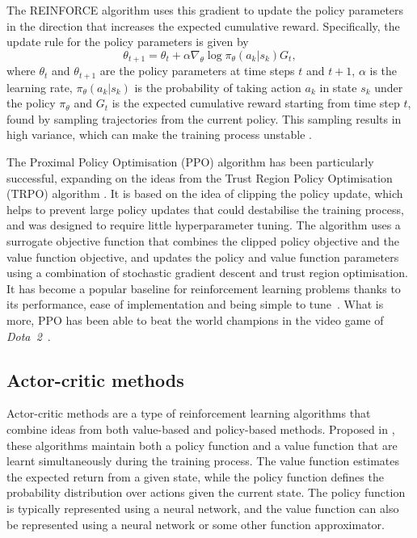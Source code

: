 The REINFORCE algorithm uses this gradient to update the policy parameters in the direction that increases the expected cumulative reward. Specifically, the update rule for the policy parameters is given by
\begin{equation}
    \theta_{t+1} = \theta_t + \alpha \nabla_{\theta} \log \pi_{\theta}(a_k|s_k) G_t,
\end{equation}
where $\theta_t$ and $\theta_{t+1}$ are the policy parameters at time steps $t$ and $t+1$, $\alpha$ is the learning rate, $\pi_{\theta}(a_k|s_k)$ is the probability of taking action $a_k$ in state $s_k$ under the policy $\pi_{\theta}$ and $G_t$ is the expected cumulative reward starting from time step $t$, found by sampling trajectories from the current policy.
This sampling results in high variance, which can make the training process unstable \autocite{arulkumaran2017}.

The Proximal Policy Optimisation (PPO) algorithm \autocite{schulman2017} has been particularly successful, expanding on the ideas from the Trust Region Policy Optimisation (TRPO) algorithm \autocite{schulman2015}.
It is based on the idea of clipping the policy update, which helps to prevent large policy updates that could destabilise the training process, and was designed to require little hyperparameter tuning.
The algorithm uses a surrogate objective function that combines the clipped policy objective and the value function objective, and updates the policy and value function parameters using a combination of stochastic gradient descent and trust region optimisation.
It has become a popular baseline for reinforcement learning problems thanks to its performance, ease of implementation and being simple to tune~\autocite{schulman2017}.
What is more, PPO has been able to beat the world champions in the video game of \textit{Dota~2}~\autocite{brockman2018,openai2019}.

\subsection{Actor-critic methods}
Actor-critic methods are a type of reinforcement learning algorithms that combine ideas from both value-based and policy-based methods.
Proposed in \autocite{konda1999}, these algorithms maintain both a policy function and a value function that are learnt simultaneously during the training process.
The value function estimates the expected return from a given state, while the policy function defines the probability distribution over actions given the current state.
The policy function is typically represented using a neural network, and the value function can also be represented using a neural network or some other function approximator.

